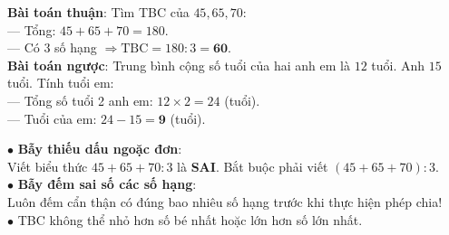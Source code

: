 \documentclass[14pt,a4paper,oneside]{extbook}
\begin{document}
\noindent
\begin{minipage}[t]{0.53\textwidth}
  \begin{tcolorbox}[
    enhanced,
    title={\footnotesize\bfseries\color{white}\faCheckCircle\ Ví dụ thực hành chuẩn mực},
    colback=green!2!white,
    colframe=green!60!black,
    arc=2.5mm, boxrule=0.8pt, top=1.8mm, bottom=1.8mm, left=2.2mm, right=2.2mm
  ]
    \footnotesize
    \textbf{Bài toán thuận}: Tìm TBC của $45, 65, 70$:\\
    --- Tổng: $45 + 65 + 70 = 180$.\\
    --- Có $3$ số hạng $\Rightarrow \text{TBC} = 180 : 3 = \mathbf{60}$.\\[1mm]
    \textbf{Bài toán ngược}: Trung bình cộng số tuổi của hai anh em là $12$ tuổi. Anh $15$ tuổi. Tính tuổi em:\\
    --- Tổng số tuổi 2 anh em: $12 \times 2 = 24$ (tuổi).\\
    --- Tuổi của em: $24 - 15 = \mathbf{9}$ (tuổi).
  \end{tcolorbox}
\end{minipage}%
\hfill
\begin{minipage}[t]{0.45\textwidth}
  \begin{tcolorbox}[
    enhanced,
    title={\footnotesize\bfseries\color{white}\faExclamationTriangle\ Mẹo tránh bẫy trắc nghiệm},
    colback=red!2!white,
    colframe=red!70!black,
    arc=2.5mm, boxrule=0.8pt, top=1.8mm, bottom=1.8mm, left=2.2mm, right=2.2mm
  ]
    \footnotesize
    $\bullet$ \textbf{Bẫy thiếu dấu ngoặc đơn}:\\
    Viết biểu thức $45 + 65 + 70 : 3$ là \textbf{SAI}. Bắt buộc phải viết $(45 + 65 + 70) : 3$.\\
    $\bullet$ \textbf{Bẫy đếm sai số các số hạng}:\\
    Luôn đếm cẩn thận có đúng bao nhiêu số hạng trước khi thực hiện phép chia!\\
    $\bullet$ TBC không thể nhỏ hơn số bé nhất hoặc lớn hơn số lớn nhất.
  \end{tcolorbox}
\end{minipage}
\end{document}
